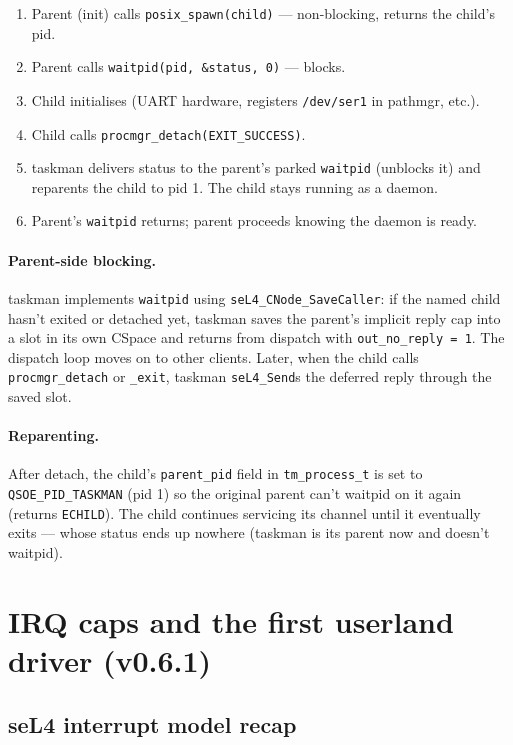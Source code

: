 \begin{enumerate}
    \item Parent (init) calls \texttt{posix\_spawn(child)} —
          non-blocking, returns the child's pid.
    \item Parent calls \texttt{waitpid(pid, \&status, 0)} — blocks.
    \item Child initialises (UART hardware, registers
          \texttt{/dev/ser1} in pathmgr, etc.).
    \item Child calls \texttt{procmgr\_detach(EXIT\_SUCCESS)}.
    \item taskman delivers status to the parent's parked
          \texttt{waitpid} (unblocks it) and reparents the child to
          pid 1.  The child stays running as a daemon.
    \item Parent's \texttt{waitpid} returns; parent proceeds knowing
          the daemon is ready.
\end{enumerate}

\paragraph{Parent-side blocking.}  taskman implements \texttt{waitpid}
using \texttt{seL4\_CNode\_SaveCaller}: if the named child hasn't
exited or detached yet, taskman saves the parent's implicit reply
cap into a slot in its own CSpace and returns from dispatch with
\texttt{out\_no\_reply = 1}.  The dispatch loop moves on to other
clients.  Later, when the child calls \texttt{procmgr\_detach} or
\texttt{\_exit}, taskman \texttt{seL4\_Send}s the deferred reply
through the saved slot.

\paragraph{Reparenting.}  After detach, the child's
\texttt{parent\_pid} field in \texttt{tm\_process\_t} is set to
\texttt{QSOE\_PID\_TASKMAN} (pid 1) so the original parent can't
waitpid on it again (returns \texttt{ECHILD}).  The child continues
servicing its channel until it eventually exits — whose status
ends up nowhere (taskman is its parent now and doesn't waitpid).

\section{IRQ caps and the first userland driver (v0.6.1)}

\subsection{seL4 interrupt model recap}

